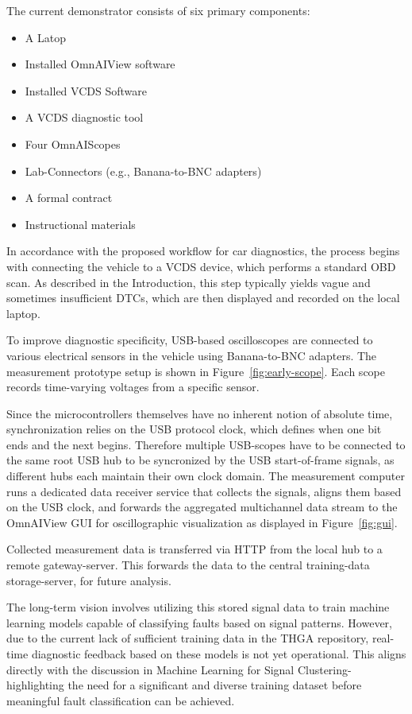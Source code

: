 \documentclass[conference,a4paper]{IEEEtran}
\begin{document}
The current demonstrator consists of six primary components:
\begin{itemize}
  \item A Latop
  \item Installed OmnAIView software
  \item Installed VCDS Software
  \item A VCDS diagnostic tool
  \item Four OmnAIScopes
  \item Lab-Connectors (e.g., Banana-to-BNC adapters)
  \item A formal contract
  \item Instructional materials
\end{itemize}
In accordance with the proposed workflow for car diagnostics, the process begins with connecting the vehicle to a VCDS device, which performs a standard OBD scan. 
As described in the Introduction, this step typically yields vague and sometimes insufficient DTCs, which are then displayed and recorded on the local laptop.

To improve diagnostic specificity, USB-based oscilloscopes are connected to various electrical sensors in the vehicle using Banana-to-BNC adapters. 
The measurement prototype setup is shown in Figure~\ref{fig:early-scope}.
Each scope records time-varying voltages from a specific sensor. 

Since the microcontrollers themselves have no inherent notion of absolute time, synchronization relies on the USB protocol clock, which defines when one bit ends and the next begins. 
Therefore multiple USB-scopes have to be connected to the same root USB hub to be syncronized by the USB start-of-frame signals, as different hubs each maintain their own clock domain.
The measurement computer runs a dedicated data receiver service that collects the signals, aligns them based on the USB clock, and forwards the aggregated multichannel data stream to the OmnAIView GUI for oscillographic visualization as displayed in Figure~\ref{fig:gui}.

Collected measurement data is transferred via HTTP from the local hub to a remote gateway-server. 
This forwards the data to the central training-data storage-server, for future analysis. 

The long-term vision involves utilizing this stored signal data to train machine learning models capable of classifying faults based on signal patterns. 
However, due to the current lack of sufficient training data in the THGA repository, real-time diagnostic feedback based on these models is not yet operational. 
This aligns directly with the discussion in Machine Learning for Signal Clustering-highlighting the need for a significant and diverse training dataset before meaningful fault classification can be achieved.
\end{document}
